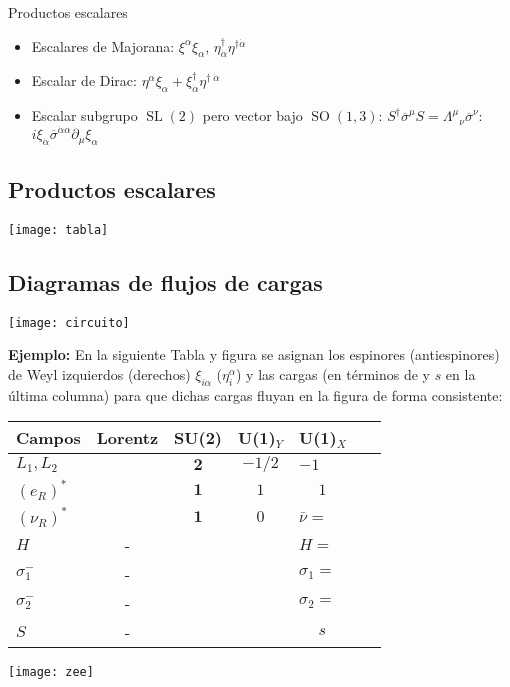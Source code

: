 \begin{frame}
Productos escalares
\begin{itemize}
\item Escalares de Majorana: $\xi^{\alpha}\xi_{\alpha}$, $\eta^{\dagger}_{ \dot{\alpha}}\eta^{\dagger \dot{\alpha}}$
\item Escalar de Dirac: $\eta^{\alpha}\xi_{\alpha}+ \xi^{\dagger}_{\dot{\alpha}}\eta^{\dagger\;\dot{\alpha  }} $


 \item Escalar subgrupo $\operatorname{SL}(2)$ pero vector bajo $\operatorname{SO}(1,3)$: $ S^\dagger\overline{\sigma}^\mu S={\Lambda^\mu}_\nu\overline{\sigma}^\nu$:
  $i\xi_{\dot{\alpha}} \overline{\sigma}^{\dot{\alpha} \alpha} \partial_{\mu} \xi_{\alpha} $

\end{itemize}



\end{frame}

\subsection{Productos escalares}
\texttt{[image: tabla]}

\subsection{Diagramas de flujos de cargas}
\texttt{[image: circuito]}


\noindent
\textbf{Ejemplo:} 
En la siguiente Tabla y figura se asignan los espinores (antiespinores) de Weyl izquierdos (derechos) $\xi_{i\alpha}$ ($\eta^{\alpha}_i$)  y las cargas  (en términos de y $s$ en la última columna) para que dichas cargas fluyan en la figura de forma consistente:
  
  \begin{tabular}{|l|c|c|c|l|}\hline
    Campos &Lorentz& SU(2) & U(1)$_Y$ & U(1)$_X$\\\hline
    $L_1,L_2$ & & $\mathbf{2}$ & $-1/2$&$-1$\\
    $\left(e_R\right)^{*}$ & & $\mathbf{1}$ & $1$&$\phantom{-}1$\\
    $\left(\nu_R\right)^{*}$ & & $\mathbf{1}$ & $0$&$\bar{\nu}=$\\
     $H$  &-&&&$H=\phantom{-}\phantom{-}$\\
     $\sigma_1^-$ &-&&&$\sigma_1=$\\
     $\sigma_2^-$ &-&&&$\sigma_2=$\\
     $S$ &-&&&$\phantom{-}s$\\\hline
  \end{tabular}\hspace{1cm} \texttt{[image: zee]}

